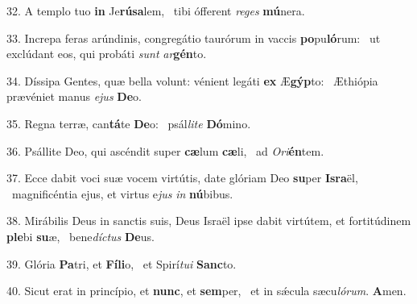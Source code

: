 32. A templo tuo \textbf{in} Je\textbf{rú}\textbf{sa}lem, \ast\  tibi ófferent \textit{re}\textit{ges} \textbf{mú}nera.\

33. Increpa feras arúndinis, congregátio taurórum in vaccis \textbf{po}pu\textbf{ló}rum: \ast\  ut exclúdant eos, qui probáti \textit{sunt} \textit{ar}\textbf{gén}to.\

34. Díssipa Gentes, quæ bella volunt: vénient legáti \textbf{ex} Æ\textbf{gýp}to: \ast\  Æthiópia prævéniet manus \textit{e}\textit{jus} \textbf{De}o.\

35. Regna terræ, can\textbf{tá}te \textbf{De}o: \ast\  psál\textit{li}\textit{te} \textbf{Dó}mino.\

36. Psállite Deo, qui ascéndit super \textbf{cæ}lum \textbf{cæ}li, \ast\  ad \textit{O}\textit{ri}\textbf{én}tem.\

37. Ecce dabit voci suæ vocem virtútis, date glóriam Deo \textbf{su}per \textbf{Is}\textbf{ra}ël, \ast\  magnificéntia ejus, et virtus e\textit{jus} \textit{in} \textbf{nú}bibus.\

38. Mirábilis Deus in sanctis suis, Deus Israël ipse dabit virtútem, et fortitúdinem \textbf{ple}bi \textbf{su}æ, \ast\  bene\textit{díc}\textit{tus} \textbf{De}us.\

39. Glória \textbf{Pa}tri, et \textbf{Fí}\textbf{li}o, \ast\  et Spirí\textit{tu}\textit{i} \textbf{Sanc}to.\

40. Sicut erat in princípio, et \textbf{nunc}, et \textbf{sem}per, \ast\  et in sǽcula sæcu\textit{ló}\textit{rum}. \textbf{A}men.\

